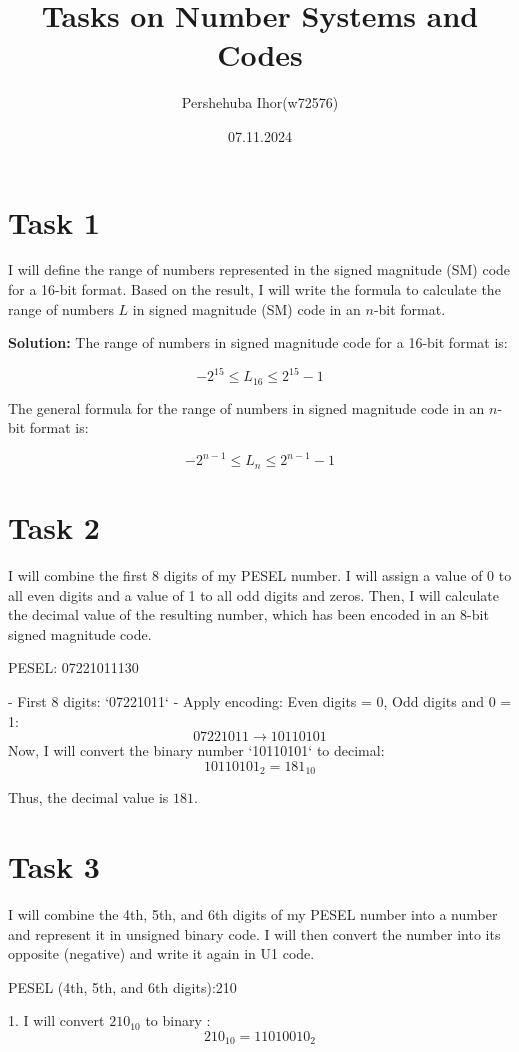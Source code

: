 \documentclass{article}
\title{Tasks on Number Systems and Codes}
\author{Pershehuba Ihor(w72576)}
\date{07.11.2024}
\begin{document}
\maketitle

\section*{Task 1}
I will define the range of numbers represented in the signed magnitude (SM) code for a 16-bit format. Based on the result, I will write the formula to calculate the range of numbers \( L \) in signed magnitude (SM) code in an \( n \)-bit format.

\textbf{Solution:}  
The range of numbers in signed magnitude code for a 16-bit format is:

\[
-2^{15} \leq L_{16} \leq 2^{15} - 1
\]

The general formula for the range of numbers in signed magnitude code in an \( n \)-bit format is:

\[
-2^{n-1} \leq L_n \leq 2^{n-1} - 1
\]

\section*{Task 2}
I will combine the first 8 digits of my PESEL number. I will assign a value of 0 to all even digits and a value of 1 to all odd digits and zeros. Then, I will calculate the decimal value of the resulting number, which has been encoded in an 8-bit signed magnitude code.

PESEL: 07221011130

- First 8 digits: `07221011`
- Apply encoding: Even digits = 0, Odd digits and 0 = 1:
\[
07221011 \rightarrow 10110101
\]
Now, I will convert the binary number `10110101` to decimal:
\[
10110101_2 = 181_{10}
\]

Thus, the decimal value is \( 181 \).

\section*{Task 3}
I will combine the 4th, 5th, and 6th digits of my PESEL number into a number and represent it in unsigned binary code. I will then convert the number into its opposite (negative) and write it again in U1 code.

PESEL (4th, 5th, and 6th digits):210

1. I will convert \( 210_{10} \) to binary :
   \[
   210_{10} = 11010010_2
   \]
\end{document}
